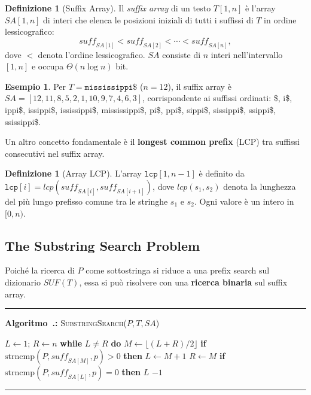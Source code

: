 \documentclass[12pt, a4paper, oneside]{book}
\newcounter{algocf}[chapter]
\renewcommand{\thealgocf}{\thechapter.\arabic{algocf}}
\newenvironment{algorithm}[1][H]{%
  \refstepcounter{algocf}%
  \par\medskip\noindent\rule{\linewidth}{0.4pt}\par\smallskip
}{%
  \par\smallskip\noindent\rule{\linewidth}{0.4pt}\par\medskip
}
\newcommand{\algcaption}[1]{\noindent\textbf{Algoritmo~\thealgocf:} #1\par\smallskip}
\newcommand{\While}[1]{\noindent\textbf{while} #1 \textbf{do}}
\newcommand{\eIf}[1]{\noindent\textbf{if} #1 \textbf{then}}
\newcommand{\Return}[1]{\noindent\textbf{return} #1}
\theoremstyle{plain}
\theoremstyle{definition}
\newtheorem{definizione}[teorema]{Definizione}
\newtheorem{esempio}[teorema]{Esempio}
\theoremstyle{remark}
\begin{document}
\begin{definizione}[Suffix Array]
Il \emph{suffix array} di un testo $T[1,n]$ è l'array $SA[1,n]$ di interi che elenca le posizioni iniziali di tutti i suffissi di $T$ in ordine lessicografico:
\[
\mathit{suff}_{SA[1]} < \mathit{suff}_{SA[2]} < \cdots < \mathit{suff}_{SA[n]},
\]
dove $<$ denota l'ordine lessicografico. $SA$ consiste di $n$ interi nell'intervallo $[1,n]$ e occupa $\Theta(n\log n)$ bit.
\end{definizione}

\begin{esempio}
Per $T = \texttt{mississippi\$}$ ($n = 12$), il suffix array è $SA = [12, 11, 8, 5, 2, 1, 10, 9, 7, 4, 6, 3]$, corrispondente ai suffissi ordinati: \$, i\$, ippi\$, issippi\$, ississippi\$, mississippi\$, pi\$, ppi\$, sippi\$, sissippi\$, ssippi\$, ssissippi\$.
\end{esempio}

Un altro concetto fondamentale è il \textbf{longest common prefix} (LCP) tra suffissi consecutivi nel suffix array.

\begin{definizione}[Array LCP]
L'array $\mathtt{lcp}[1, n-1]$ è definito da $\mathtt{lcp}[i] = lcp(\mathit{suff}_{SA[i]}, \mathit{suff}_{SA[i+1]})$, dove $lcp(s_1, s_2)$ denota la lunghezza del più lungo prefisso comune tra le stringhe $s_1$ e $s_2$. Ogni valore è un intero in $[0, n)$.
\end{definizione}

\subsection{The Substring Search Problem}
\label{subsec:substr-search}

Poiché la ricerca di $P$ come sottostringa si riduce a una prefix search sul dizionario $\mathit{SUF}(T)$, essa si può risolvere con una \textbf{ricerca binaria} sul suffix array.

\begin{algorithm}[H]
\algcaption{\textsc{SubstringSearch}($P, T, SA$)}
\label{alg:substr-search}
$L \gets 1$; $R \gets n$\;
\While{$L \neq R$}{
  $M \gets \lfloor (L + R)/2 \rfloor$\;
  \eIf{$\mathrm{strncmp}(P, \mathit{suff}_{SA[M]}, p) > 0$}{
    $L \gets M + 1$\;
  }{
    $R \gets M$\;
  }
}
\eIf{$\mathrm{strncmp}(P, \mathit{suff}_{SA[L]}, p) = 0$}{
  \Return $L$\;
}{
  \Return $-1$\;
}
\end{algorithm}
\end{document}
